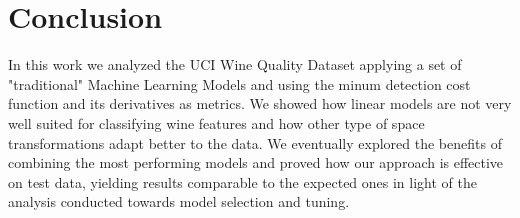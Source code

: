 \section{Conclusion}
In this work we analyzed the UCI Wine Quality Dataset applying a set of "traditional" Machine Learning Models and using the minum detection cost function and its derivatives as metrics. We showed how linear models are not very well suited for classifying wine features and how other type of space transformations adapt better to the data. We eventually explored the benefits of combining the most performing models and proved how our approach is effective on test data, yielding results comparable to the expected ones in light of the analysis conducted towards model selection and tuning.



